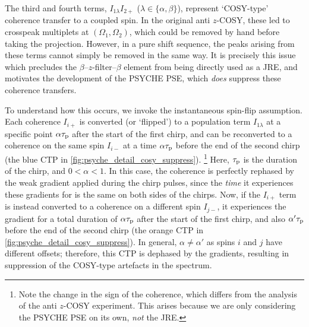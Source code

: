 The third and fourth terms, $I_{1\lambda}I_{2+}$ ($\lambda \in \{\alpha,\beta\}$), represent `COSY-type' coherence transfer to a coupled spin.
In the original anti $z$-COSY, these led to crosspeak multiplets at $(\Omega_1, \Omega_2)$, which could be removed by hand before taking the projection.
However, in a pure shift sequence, the peaks arising from these terms cannot simply be removed in the same way.
It is precisely this issue which precludes the $\beta$--$z$-filter--$\beta$ element from being directly used as a JRE, and motivates the development of the PSYCHE PSE, which \textit{does} suppress these coherence transfers.

To understand how this occurs, we invoke the instantaneous spin-flip assumption.
Each coherence $I_{i+}$ is converted (or `flipped') to a population term $I_{1\lambda}$ at a specific point $\alpha\tau_\mathrm{p}$ after the start of the first chirp, and can be reconverted to a coherence on the same spin $I_{i-}$ at a time $\alpha\tau_\mathrm{p}$ before the end of the second chirp (the blue CTP in \cref{fig:psyche_detail_cosy_suppress}).%
\footnote{Note the change in the sign of the coherence, which differs from the analysis of the anti $z$-COSY experiment. This arises because we are only considering the PSYCHE PSE on its own, \textit{not} the JRE.}
Here, $\tau_\mathrm{p}$ is the duration of the chirp, and $0 < \alpha < 1$.
In this case, the coherence is perfectly rephased by the weak gradient applied during the chirp pulses, since the \textit{time} it experiences these gradients for is the same on both sides of the chirps.
Now, if the $I_{i+}$ term is instead converted to a coherence on a different spin $I_{j-}$, it experiences the gradient for a total duration of $\alpha\tau_\mathrm{p}$ after the start of the first chirp, and also $\alpha'\tau_\mathrm{p}$ before the end of the second chirp (the orange CTP in \cref{fig:psyche_detail_cosy_suppress}).
In general, $\alpha \neq \alpha'$ as spins $i$ and $j$ have different offsets; therefore, this CTP is dephased by the gradients, resulting in suppression of the COSY-type artefacts in the spectrum.

